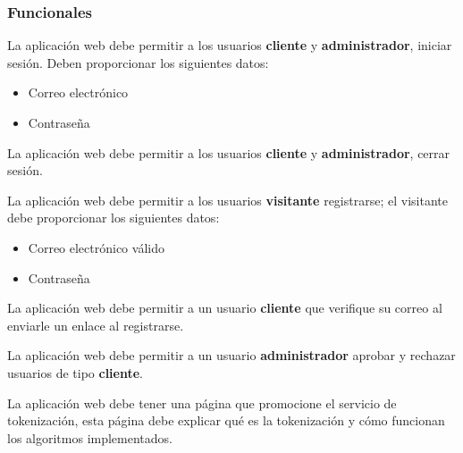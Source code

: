 %
%

\subsubsection{Funcionales}


{
  La aplicación web debe permitir a los usuarios \textbf{cliente} y
  \textbf{administrador}, iniciar sesión. Deben proporcionar los siguientes
  datos:
  \begin{itemize}
    \item Correo electrónico
    \item Contraseña
  \end{itemize}
}

{
  La aplicación web debe permitir a los usuarios \textbf{cliente} y
  \textbf{administrador}, cerrar sesión.
}

{
  La aplicación web debe permitir a los usuarios \textbf{visitante}
  registrarse; el visitante debe proporcionar los siguientes datos:
  \begin{itemize}
    \item Correo electrónico válido
    \item Contraseña
  \end{itemize}
}

{
  La aplicación web debe permitir a un usuario \textbf{cliente} que verifique
  su correo al enviarle un enlace al registrarse.
}

{
  La aplicación web debe permitir a un usuario \textbf{administrador} aprobar
  y rechazar usuarios de tipo \textbf{cliente}.
}

{
  La aplicación web debe tener una página que promocione el servicio de
  tokenización, esta página debe explicar qué es la tokenización y cómo
  funcionan los algoritmos implementados.
}


